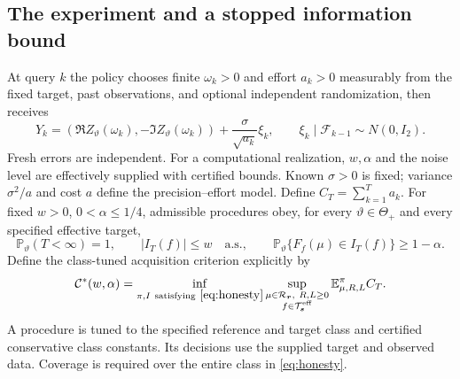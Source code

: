 \documentclass[10pt]{amsart}
\theoremstyle{definition}
\theoremstyle{remark}
\theoremstyle{plain}
\newcommand{\E}{\mathbb E}
\newcommand{\Prob}{\mathbb P}
\newcommand{\ThetaAll}{\Theta_+}
\newcommand{\Teff}{\mathcal T_{\boldsymbol s}^{\mathrm{eff}}}
\newcommand{\Rclass}{\mathcal R_{\boldsymbol r}}
\begin{document}
\subsection{The experiment and a stopped information bound}
At query $k$ the policy chooses finite $\omega_k>0$ and effort $a_k>0$ measurably from the fixed target, past observations, and optional independent randomization, then receives
\begin{equation}\label{eq:gaussian}
 Y_k=(\Re Z_\vartheta(\omega_k),-\Im Z_\vartheta(\omega_k))
          +\frac{\sigma}{\sqrt{a_k}}\xi_k,
 \qquad \xi_k\mid\mathcal F_{k-1}\sim N(0,I_2).
\end{equation}
Fresh errors are independent. For a computational realization, $w,\alpha$ and the noise level are effectively supplied with certified bounds. Known $\sigma>0$ is fixed; variance $\sigma^2/a$ and cost $a$ define the precision--effort model. Define $C_T=\sum_{k=1}^Ta_k$. For fixed $w>0$, $0<\alpha\le1/4$, admissible procedures obey, for every $\vartheta\in\ThetaAll$ and every specified effective target,
\begin{equation}\label{eq:honesty}
 \Prob_\vartheta(T<\infty)=1,\qquad
 |I_T(f)|\le w\quad\text{a.s.},\qquad
 \Prob_\vartheta\{F_f(\mu)\in I_T(f)\}\ge1-\alpha.
\end{equation}
Define the class-tuned acquisition criterion explicitly by
\[
 \mathcal C^*(w,\alpha)=\inf_{\pi,I\ \mathrm{satisfying}\ \eqref{eq:honesty}}
 \sup_{\substack{\mu\in\Rclass,\ R,L\ge0\\ f\in\Teff}}
 \E_{\mu,R,L}^{\pi} C_T.
\]
A procedure is tuned to the specified reference and target class and certified conservative class constants. Its decisions use the supplied target and observed data. Coverage is required over the entire class in \eqref{eq:honesty}.
\end{document}
